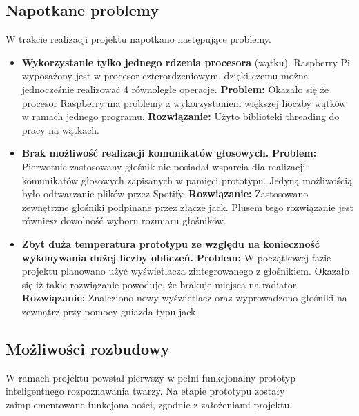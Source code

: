 \documentclass[a4paper,12pt,reqno]{article}
\begin{document}
\subsection{Napotkane problemy}
W trakcie realizacji projektu napotkano następujące problemy.
\begin{itemize}
	\item \textbf{Wykorzystanie tylko jednego rdzenia procesora} (wątku). Raspberry Pi wyposażony jest w procesor czterordzeniowym, dzięki czemu można jednocześnie realizować 4 równoległe operacje. \newline \textbf{Problem:} \newline Okazało się że procesor Raspberry ma problemy z wykorzystaniem większej lioczby wątków w ramach jednego programu. \newline \textbf{Rozwiązanie:} \newline Użyto biblioteki threading do pracy na wątkach.
	\item \textbf{Brak możliwość realizacji komunikatów głosowych.} \newline \textbf{Problem:} \newline Pierwotnie zastosowany głośnik nie posiadał wsparcia dla realizacji komunikatów głosowych zapisanych w pamięci prototypu. Jedyną możliwością było odtwarzanie plików przez Spotify. \newline \textbf{Rozwiązanie:} \newline Zastosowano zewnętrzne głośniki podpinane przez złącze jack. Plusem tego rozwiązanie jest równiesz dowolność wyboru rozmiaru głośników.
	\item \textbf{Zbyt duża temperatura prototypu ze względu na konieczność wykonywania dużej liczby obliczeń.} \newline \textbf{Problem:} \newline W początkowej fazie projektu planowano użyć wyświetlacza zintegrowanego z głośnikiem. Okazało się iż takie rozwiązanie powoduje, że brakuje miejsca na radiator. \newline \textbf{Rozwiązanie:} \newline Znaleziono nowy wyświetlacz oraz wyprowadzono głośniki na zewnątrz przy pomocy gniazda typu jack.
\end{itemize}

\subsection{Możliwości rozbudowy}
W ramach projektu powstał pierwszy w pełni funkcjonalny prototyp inteligentnego rozpoznawania twarzy. Na etapie prototypu zostały zaimplementowane funkcjonalności, zgodnie z założeniami projektu.
\end{document}
